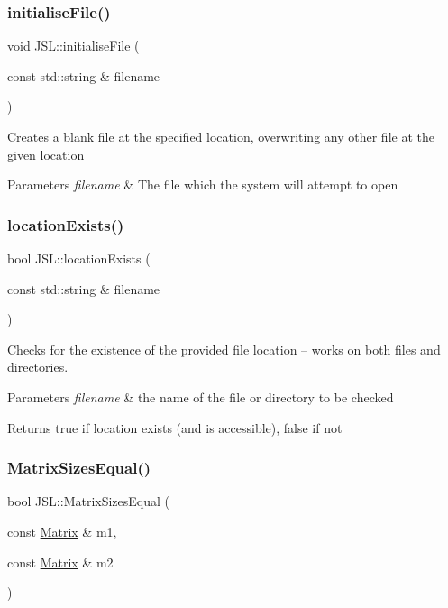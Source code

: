 \subsubsection{\texorpdfstring{initialise\+File()}{initialiseFile()}}
{\footnotesize\ttfamily void J\+S\+L\+::initialise\+File (\begin{DoxyParamCaption}\item[{const std\+::string \&}]{filename }\end{DoxyParamCaption})\hspace{0.3cm}{\ttfamily [inline]}}

Creates a blank file at the specified location, overwriting any other file at the given location 
\begin{DoxyParams}{Parameters}
{\em filename} & The file which the system will attempt to open \\
\hline
\end{DoxyParams}
\mbox{\label{namespaceJSL_a1752cd7c6e1134da51e9307527e0d788}} 
\subsubsection{\texorpdfstring{location\+Exists()}{locationExists()}}
{\footnotesize\ttfamily bool J\+S\+L\+::location\+Exists (\begin{DoxyParamCaption}\item[{const std\+::string \&}]{filename }\end{DoxyParamCaption})\hspace{0.3cm}{\ttfamily [inline]}}

Checks for the existence of the provided file location -- works on both files and directories. 
\begin{DoxyParams}{Parameters}
{\em filename} & the name of the file or directory to be checked \\
\hline
\end{DoxyParams}
\begin{DoxyReturn}{Returns}
true if location exists (and is accessible), false if not 
\end{DoxyReturn}
\mbox{\label{namespaceJSL_a38d1bbf23dc57ec028ea8d91a9688957}} 
\subsubsection{\texorpdfstring{Matrix\+Sizes\+Equal()}{MatrixSizesEqual()}}
{\footnotesize\ttfamily bool J\+S\+L\+::\+Matrix\+Sizes\+Equal (\begin{DoxyParamCaption}\item[{const \hyperlink{classJSL_1_1Matrix}{Matrix} \&}]{m1,  }\item[{const \hyperlink{classJSL_1_1Matrix}{Matrix} \&}]{m2 }\end{DoxyParamCaption})\hspace{0.3cm}{\ttfamily [inline]}}

